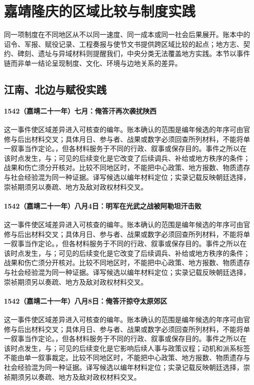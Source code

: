 \section{嘉靖隆庆的区域比较与制度实践}

同一项制度在不同地区从不以同一速度、同一成本或同一社会后果展开。账本中的诏令、军报、赋役记录、工程奏报与使节文书提供跨区域比较的起点；地方志、契约、碑刻、遗址与异域材料则提醒我们，中央分类无法覆盖地方实践。本节以事件链而非单一结论呈现制度、文化、环境与边地关系的差异。

\subsection{江南、北边与赋役实践}

\paragraph{1542（嘉靖二十一年）七月：俺答汗再次袭扰陕西} 这一事件使区域差异进入可核查的编年。账本确认的范围是编年候选的年序可由官修与后出材料交叉；具体月日、参与者、战果或数字必须回查所列材料，不能将单一叙事当作定论。，但各材料服务于不同的行政、叙事或保存目的。事件之所以在该时点发生，与；可见的后续变化是它改变了后续调兵、补给或地方秩序的条件；战果和伤亡须分开核对。比较不同地区时，不能把中心政策、地方报数、物质遗存与社会经验混为同一种证据。译写候选以编年材料定位；实录记载反映朝廷选择，崇祯期须另以奏疏、地方及敌对政权材料交叉。

\paragraph{1542（嘉靖二十一年）八月4日：明军在光武之战被阿勒坦汗击败} 这一事件使区域差异进入可核查的编年。账本确认的范围是编年候选的年序可由官修与后出材料交叉；具体月日、参与者、战果或数字必须回查所列材料，不能将单一叙事当作定论。，但各材料服务于不同的行政、叙事或保存目的。事件之所以在该时点发生，与；可见的后续变化是它改变了后续调兵、补给或地方秩序的条件；战果和伤亡须分开核对。比较不同地区时，不能把中心政策、地方报数、物质遗存与社会经验混为同一种证据。译写候选以编年材料定位；实录记载反映朝廷选择，崇祯期须另以奏疏、地方及敌对政权材料交叉。

\paragraph{1542（嘉靖二十一年）八月8日：俺答汗掠夺太原郊区} 这一事件使区域差异进入可核查的编年。账本确认的范围是编年候选的年序可由官修与后出材料交叉；具体月日、参与者、战果或数字必须回查所列材料，不能将单一叙事当作定论。，但各材料服务于不同的行政、叙事或保存目的。事件之所以在该时点发生，与；可见的后续变化是它影响后续人事与政策议程；动机和派系标签不能由单一叙事裁定。比较不同地区时，不能把中心政策、地方报数、物质遗存与社会经验混为同一种证据。译写候选以编年材料定位；实录记载反映朝廷选择，崇祯期须另以奏疏、地方及敌对政权材料交叉。

